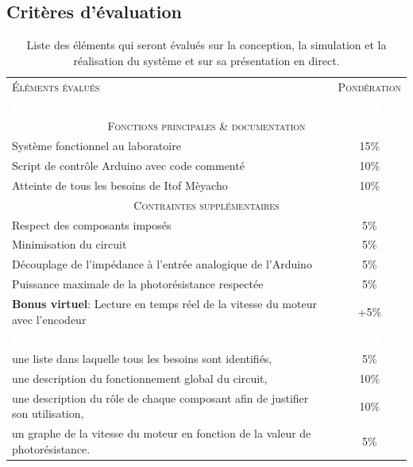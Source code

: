 \documentclass[english,french,12pt]{article}
\begin{document}
\subsection*{Critères d'évaluation}

\renewcommand{\arraystretch}{1.5}
\begin{table}[h]
\centering
    \begin{tabular}{l c}
    \hline
     \textsc{Éléments évalués} & \textsc{Pondération}\\
     \rowcolor{black} \textcolor{white}{\textbf{Conception}} & \textcolor{white}{\textbf{50\%}}\\
     \multicolumn{2}{c}{\textsc{Fonctions principales \& documentation}}\\
     \hline
     Système fonctionnel au laboratoire & 15\%\\
     Script de contrôle Arduino avec code commenté & 10\%\\
     Atteinte de tous les besoins de Itof Mèyacho & 10\%\\
     \hline
     \multicolumn{2}{c}{\textsc{Contraintes supplémentaires}}\\
     \hline
     Respect des composants imposés & 5\%\\
     Minimisation du circuit & 5\%\\
     Découplage de l'impédance à l'entrée analogique de l'Arduino  & 5\%\\
     Puissance maximale de la photorésistance respectée & 5\%\\
     \textbf{Bonus virtuel}: Lecture en temps réel de la vitesse du moteur avec l'encodeur & +5\%\\
     \rowcolor{black} \textcolor{white}{\textbf{Présentation du circuit comprenant:}} & \textcolor{white}{\textbf{30\%}}\\
     une liste dans laquelle tous les besoins sont identifiés, & 5\%\\
     une description du fonctionnement global du circuit, & 10\%\\
     une description du rôle de chaque composant afin de justifier son utilisation, & 10\%\\
     un graphe de la vitesse du moteur en fonction de la valeur de photorésistance. & 5\%\\
     \hline
    \end{tabular}
\caption{Liste des éléments qui seront évalués sur la conception, la simulation et la réalisation du système et sur sa présentation en direct.}
\label{tab:1}
\end{table}
\end{document}

